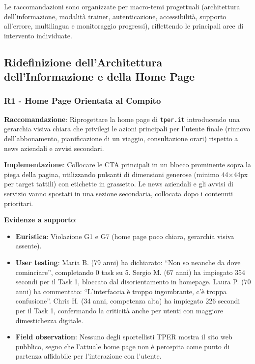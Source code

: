 ﻿\documentclass[11pt,a4paper]{article}
\begin{document}
Le raccomandazioni sono organizzate per macro-temi progettuali (architettura
dell'informazione, modalità trainer, autenticazione, accessibilità, supporto
all'errore, multilingua e monitoraggio progressi), riflettendo le principali
aree di intervento individuate.


\subsection{Ridefinizione dell'Architettura dell'Informazione e della Home Page}

\subsubsection{R1 - Home Page Orientata al Compito}
\label{rec:R1}

\textbf{Raccomandazione}: Riprogettare la home page di \texttt{tper.it}
introducendo una gerarchia visiva chiara che privilegi le azioni principali
per l'utente finale (rinnovo dell'abbonamento, pianificazione di un viaggio,
consultazione orari) rispetto a news aziendali e avvisi secondari.

\textbf{Implementazione}: Collocare le CTA principali in un blocco
prominente sopra la piega della pagina, utilizzando pulsanti di dimensioni
generose (minimo 44$\times$44px per target tattili) con etichette in
grassetto. Le news aziendali e gli avvisi di servizio vanno spostati in
una sezione secondaria, collocata dopo i contenuti prioritari.

\textbf{Evidenze a supporto}:
\begin{itemize}
    \item \textbf{Euristica}: Violazione G1 e G7 (home page poco chiara,
    gerarchia visiva assente).
    \item \textbf{User testing}: Maria B. (79 anni) ha dichiarato: “Non so
    neanche da dove cominciare”, completando 0 task su 5. Sergio M.
    (67 anni) ha impiegato 354 secondi per il Task 1, bloccato dal
    disorientamento in homepage. Laura P. (70 anni) ha commentato:
    “L'interfaccia è troppo ingombrante, c'è troppa confusione”.
    Chris H. (34 anni, competenza alta) ha impiegato 226 secondi per il
    Task 1, confermando la criticit\`a anche per utenti con maggiore
    dimestichezza digitale.
    \item \textbf{Field observation}: Nessuno degli sportellisti TPER mostra
    il sito web pubblico, segno che l’attuale home page non \`e percepita come
    punto di partenza affidabile per l’interazione con l’utente.
\end{itemize}
\end{document}
